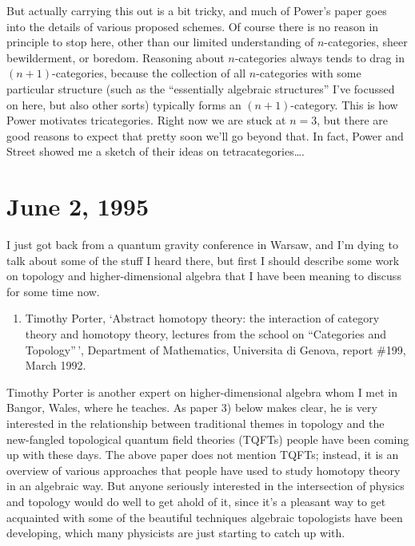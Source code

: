 \documentclass{article}
\def\tightlist{}
\begin{document}
But actually carrying this out is a bit tricky, and much of Power's
paper goes into the details of various proposed schemes. Of course there
is no reason in principle to stop here, other than our limited
understanding of \(n\)-categories, sheer bewilderment, or boredom.
Reasoning about \(n\)-categories always tends to drag in
\((n+1)\)-categories, because the collection of all \(n\)-categories
with some particular structure (such as the ``essentially algebraic
structures'' I've focussed on here, but also other sorts) typically
forms an \((n+1)\)-category. This is how Power motivates tricategories.
Right now we are stuck at \(n = 3\), but there are good reasons to
expect that pretty soon we'll go beyond that. In fact, Power and Street
showed me a sketch of their ideas on tetracategories\ldots.



\hypertarget{week54}{%
\section{June 2, 1995}\label{week54}}

I just got back from a quantum gravity conference in Warsaw, and I'm
dying to talk about some of the stuff I heard there, but first I should
describe some work on topology and higher-dimensional algebra that I
have been meaning to discuss for some time now.

\begin{enumerate}
\def\labelenumi{\arabic{enumi})}
\tightlist
\item
  Timothy Porter, `Abstract homotopy theory: the interaction of category
  theory and homotopy theory, lectures from the school on ``Categories
  and Topology''\,', Department of Mathematics, Universita di Genova,
  report \#199, March 1992.
\end{enumerate}

Timothy Porter is another expert on higher-dimensional algebra whom I
met in Bangor, Wales, where he teaches. As paper 3) below makes clear,
he is very interested in the relationship between traditional themes in
topology and the new-fangled topological quantum field theories (TQFTs)
people have been coming up with these days. The above paper does not
mention TQFTs; instead, it is an overview of various approaches that
people have used to study homotopy theory in an algebraic way. But
anyone seriously interested in the intersection of physics and topology
would do well to get ahold of it, since it's a pleasant way to get
acquainted with some of the beautiful techniques algebraic topologists
have been developing, which many physicists are just starting to catch
up with.
\end{document}
